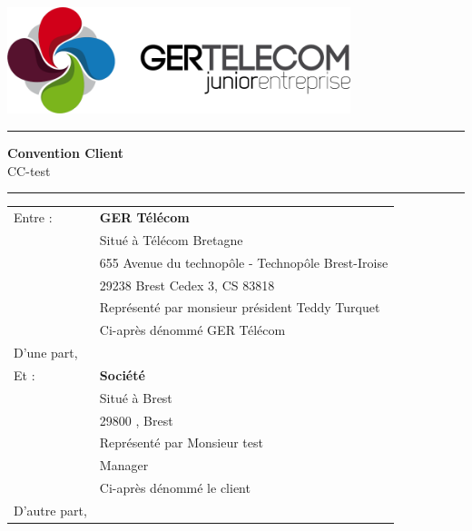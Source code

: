 \documentclass[10pt,a4paper]{article}
\renewcommand{\headrulewidth}{0pt}
\begin{document}
\centering
\includegraphics[width=10cm]{GER.png}\\
\rule{\linewidth}{.5pt}
\Huge \textbf{\textsf{Convention Client}}\\
\vspace{0.2cm}
\huge \textsf{CC-test}
\rule{\linewidth}{.5pt}
\normalsize
\flushleft
\vspace{1cm}
\begin{tabular}{ll}
Entre : 	&\textbf{GER Télécom}\\
&Situé à Télécom Bretagne \\
&655 Avenue du technopôle - Technopôle Brest-Iroise \\
&29238 Brest Cedex 3, CS 83818\\
&Représenté par monsieur président Teddy Turquet\\
\vspace{0.5cm}&Ci-après dénommé GER Télécom\\
\vspace{1cm}D'une part,\\
Et :		&\textbf{Société}\\
&Situé à Brest\\
&29800 , Brest\\
&Représenté par Monsieur test\\
&Manager\\
\vspace{0.5cm}&Ci-après dénommé le client\\
D'autre part,\\
\end{tabular}
\newpage
\renewcommand{\headrulewidth}{0pt}

\lipsum[1]
\lipsum[1]
\lipsum[1]
\lipsum[1]
\lipsum[1]
\lipsum[1]
\lipsum[1]
\lipsum[1]
\lipsum[1]
\lipsum[1]
\lipsum[1]
\lipsum[1]
\lipsum[1]
\lipsum[1]
\lipsum[1]
\lipsum[1]
\lipsum[1]
\lipsum[1]
\end{document}
